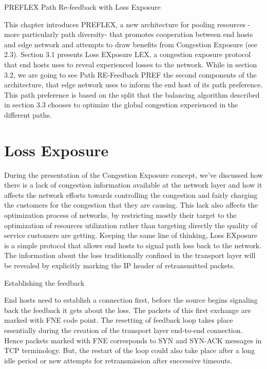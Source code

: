PREFLEX Path Re-feedback with Loss Exposure

This chapter introduces PREFLEX, a new architecture for pooling resources -more particularly path diversity- that promotes cooperation between end hosts and edge network and attempts to draw benefits from Congestion Exposure (see 2.3). Section 3.1 presents Loss EXposure LEX, a congestion exposure protocol that end hosts uses to reveal experienced losses to the network. While in section 3.2, we are going to see Path RE-Feedback PREF the second components of the architecture, that edge network uses to inform the end host of its path preference. This path preference is based on  the split that the balancing algorithm described in section 3.3 chooses to optimize the global congestion experienced in the different paths.

\section{Loss Exposure}

During the presentation of the Congestion Exposure concept, we've discussed how there is a lack of congestion information available at the network layer and how it affects the network efforts towards controlling the congestion and fairly charging the customers for the congestion that they are causing. This lack also affects the optimization process of networks, by restricting mostly their target to the optimization of resources utilization rather than targeting directly the quality of service customers are getting. Keeping the same line of thinking, Loss EXposure is a simple protocol that allows end hosts to signal path loss back to the network. The information about the loss traditionally confined in the transport layer will be revealed by explicitly marking the IP header of retransmitted  packets.

Establishing the feedback

End hosts need to establish a connection first, before the source begins signaling back the feedback it gets about the loss. The packets of this first exchange are marked with FNE code point. The resetting of  feedback loop takes place essentially during the creation of the transport layer end-to-end connection.  Hence packets marked with FNE corresponds to SYN and SYN-ACK messages in TCP terminology. But, the restart of the loop could also take place after a long idle period or new attempts for retransmission after successive timeouts.

